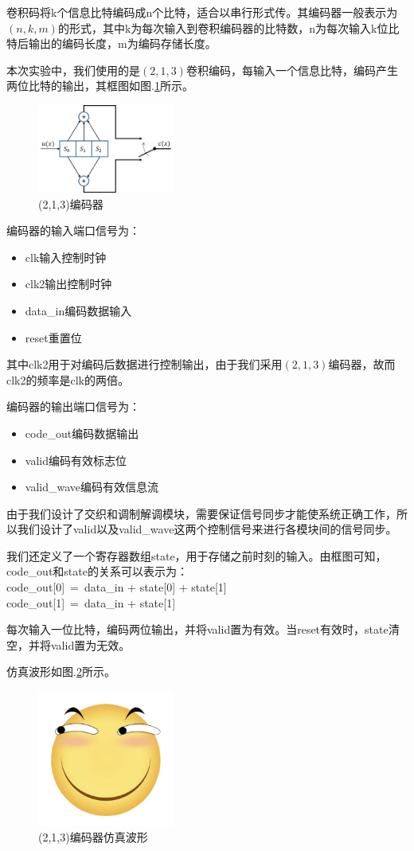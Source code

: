 卷积码将k个信息比特编码成n个比特，适合以串行形式传。其编码器一般表示为$(n,k,m)$的形式，其中k为每次输入到卷积编码器的比特数，n为每次输入k位比特后输出的编码长度，m为编码存储长度。

本次实验中，我们使用的是$(2,1,3)$卷积编码，每输入一个信息比特，编码产生两位比特的输出，其框图如图.\ref{fig:encoder}所示。

\begin{figure}
\centering
\includegraphics[width=0.4\textwidth]{encoder.jpg}
\caption{\label{fig:encoder}(2,1,3)编码器}
\end{figure}

编码器的输入端口信号为：
\begin{itemize}
\item clk\quad        输入控制时钟
\item clk2\quad       输出控制时钟
\item data\_in\quad    编码数据输入
\item reset\quad    重置位
\end{itemize}
其中clk2用于对编码后数据进行控制输出，由于我们采用$(2,1,3)$编码器，故而clk2的频率是clk的两倍。

编码器的输出端口信号为：
\begin{itemize}
\item code\_out\quad        编码数据输出
\item valid\quad       编码有效标志位
\item valid\_wave\quad    编码有效信息流
\end{itemize}
由于我们设计了交织和调制解调模块，需要保证信号同步才能使系统正确工作，所以我们设计了valid以及valid\_wave这两个控制信号来进行各模块间的信号同步。

我们还定义了一个寄存器数组state，用于存储之前时刻的输入。由框图可知，code\_out和state的关系可以表示为：\\
\quad\quad\quad code\_out[0]~=~data\_in + state[0] + state[1]\\
\quad\quad\quad code\_out[1]~=~data\_in + state[1]

每次输入一位比特，编码两位输出，并将valid置为有效。当reset有效时，state清空，并将valid置为无效。

仿真波形如图.\ref{fig:fangzhen}所示。

\begin{figure}
\centering
\includegraphics[width=0.4\textwidth]{encoder_simulation.jpg}
\caption{\label{fig:fangzhen}(2,1,3)编码器仿真波形}
\end{figure}

